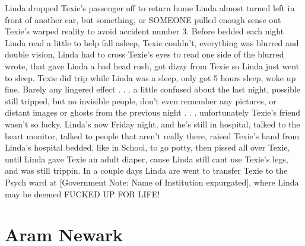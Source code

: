 \documentclass[12pt]{book}
\begin{document}
Linda dropped Texie's passenger off to return home Linda almost turned left in front of another car, but something, or SOMEONE pulled enough sense out Texie's warped reality to avoid accident number 3. Before bedded each night Linda read a little to help fall asleep, Texie couldn't, everything was blurred and double vision, Linda had to cross Texie's eyes to read one side of the blurred wrote, that gave Linda a bad head rush, got dizzy from Texie so Linda just went to sleep. Texie did trip while Linda was a sleep, only got 5 hours sleep, woke up fine. Barely any lingered effect . . .  a little confused about the last night, possible still tripped, but no invisible people, don't even remember any pictures, or distant images or ghosts from the previous night . . .  unfortunately Texie's friend wasn't so lucky. Linda's now Friday night, and he's still in hospital, talked to the heart monitor, talked to people that aren't really there, raised Texie's hand from Linda's hospital bedded, like in School, to go potty, then pissed all over Texie, until Linda gave Texie an adult diaper, cause Linda still cant use Texie's legs, and was still trippin. In a couple days Linda are went to transfer Texie to the Psych ward at [Government Note: Name of Institution expurgated], where Linda may be deemed FUCKED UP FOR LIFE!



\chapter{Aram Newark}
\end{document}
